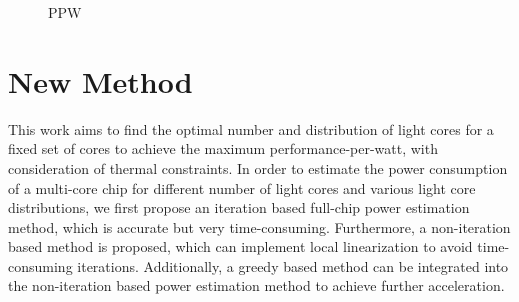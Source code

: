 \begin{figure}[htb]
\centering
{}
\caption{PPW}  
\label{fig:ppw}
\end{figure}

\section{New Method}

This work aims to find the optimal number and distribution of light cores for a fixed set of cores to achieve the maximum performance-per-watt, with consideration of thermal constraints. In order to estimate the power consumption of a multi-core chip for different number of light cores and various light core distributions, we first propose an iteration based full-chip power estimation method, which is accurate but very time-consuming. Furthermore, a non-iteration based method is proposed, which can implement local linearization to avoid time-consuming iterations. Additionally, a greedy based method can be integrated into the non-iteration based power estimation method to achieve further acceleration.

